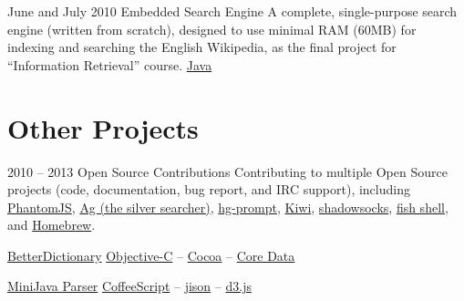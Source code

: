 \documentclass{tccv}
\begin{document}
{{\begin{project_list}
\vspace{-6pt}
	 
\item{June and July 2010}
	 {}
	 {Embedded Search Engine}
	 {A complete, single-purpose search engine (\mbox{written} from scratch), designed to use minimal RAM (60MB) for indexing and searching the English Wikipedia, as the final project for ``\mbox{Information} Retrieval'' course.}
	 {%
		 \href{http://www.oracle.com/technetwork/java/}{Java}%
	 }

\end{project_list}



\vspace{-10pt}







\section{Other Projects}

\begin{project_list}
	 
\item{2010 -- 2013}
	 {}
	 {Open Source Contributions}
	 {Contributing to multiple Open Source projects (code, documentation, bug report, and IRC support), \mbox{including}
	 \href{http://phantomjs.org}{PhantomJS}, 
	 \href{https://github.com/ggreer/the_silver_searcher}{Ag (the silver searcher)},
	 \href{http://bitbucket.org/sjl/hg-prompt/}{hg-prompt},
	 \href{https://github.com/allending/Kiwi}{Kiwi},
	 \href{https://github.com/clowwindy/shadowsocks/}{shadowsocks}, 
	 \href{http://fishshell.com}{fish shell}, and 
	 \href{https://github.com/mxcl/homebrew}{Homebrew}.}
	 {}
	 
\end{project_list}

\begin{oneline_projects}

\item{\href{http://pooriaazimi.github.io/BetterDictionary/}{BetterDictionary}}
	 {%
	 	\href{https://en.wikipedia.org/wiki/Objective-C}{Objective-C} -- 
		\href{https://en.wikipedia.org/wiki/Cocoa_(API)}{Cocoa} -- 
		\href{https://en.wikipedia.org/wiki/Core_Data}{Core Data}%
	 }	

\item{\href{https://github.com/pooriaazimi/Mini-Java}{MiniJava Parser}}
	 {%
		 \href{http://coffeescript.org}{CoffeeScript} -- 
		 \href{http://zaach.github.io/jison/}{jison} -- 
		 \href{http://d3js.org}{d3.js}%
	 }


\end{oneline_projects}}}
\end{document}
